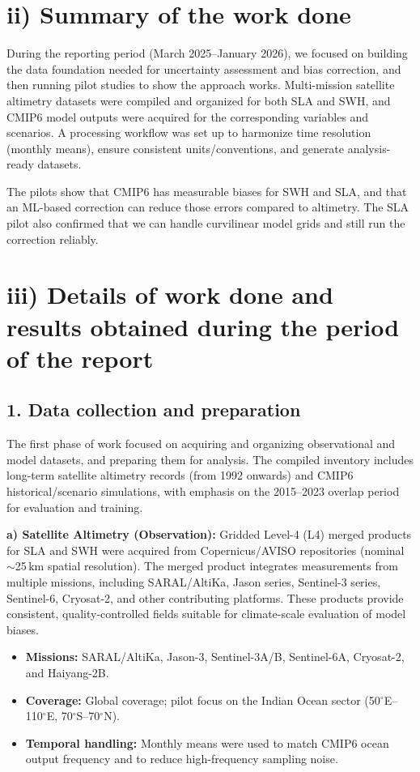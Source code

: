 \documentclass[11pt,a4paper]{article}
\begin{document}
\section*{ii) Summary of the work done}
During the reporting period (March 2025--January 2026), we focused on building the data foundation needed for uncertainty assessment and bias correction, and then running pilot studies to show the approach works. Multi-mission satellite altimetry datasets were compiled and organized for both SLA and SWH, and CMIP6 model outputs were acquired for the corresponding variables and scenarios. A processing workflow was set up to harmonize time resolution (monthly means), ensure consistent units/conventions, and generate analysis-ready datasets.

The pilots show that CMIP6 has measurable biases for SWH and SLA, and that an ML-based correction can reduce those errors compared to altimetry. The SLA pilot also confirmed that we can handle curvilinear model grids and still run the correction reliably.

\section*{iii) Details of work done and results obtained during the period of the report}

\subsection*{1. Data collection and preparation}
The first phase of work focused on acquiring and organizing observational and model datasets, and preparing them for analysis. The compiled inventory includes long-term satellite altimetry records (from 1992 onwards) and CMIP6 historical/scenario simulations, with emphasis on the 2015--2023 overlap period for evaluation and training.

\textbf{a) Satellite Altimetry (Observation):}
Gridded Level-4 (L4) merged products for SLA and SWH were acquired from Copernicus/AVISO repositories (nominal $\sim$25\,km spatial resolution). The merged product integrates measurements from multiple missions, including SARAL/AltiKa, Jason series, Sentinel-3 series, Sentinel-6, Cryosat-2, and other contributing platforms. These products provide consistent, quality-controlled fields suitable for climate-scale evaluation of model biases.
\begin{itemize}
    \item \textbf{Missions:} SARAL/AltiKa, Jason-3, Sentinel-3A/B, Sentinel-6A, Cryosat-2, and Haiyang-2B.
    \item \textbf{Coverage:} Global coverage; pilot focus on the Indian Ocean sector (50$^\circ$E--110$^\circ$E, 70$^\circ$S--70$^\circ$N).
    \item \textbf{Temporal handling:} Monthly means were used to match CMIP6 ocean output frequency and to reduce high-frequency sampling noise.
\end{itemize}
\end{document}
